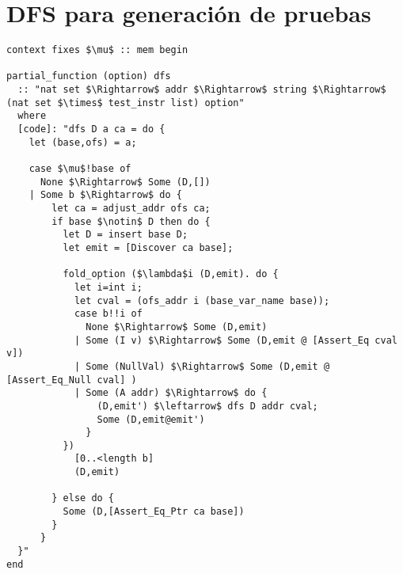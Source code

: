 \chapter{DFS para generación de pruebas}
\label{ap:dfs_test}

\begin{lstlisting}[mathescape=true]
context fixes $\mu$ :: mem begin

partial_function (option) dfs
  :: "nat set $\Rightarrow$ addr $\Rightarrow$ string $\Rightarrow$ (nat set $\times$ test_instr list) option"
  where
  [code]: "dfs D a ca = do {
    let (base,ofs) = a;

    case $\mu$!base of
      None $\Rightarrow$ Some (D,[])
    | Some b $\Rightarrow$ do {
        let ca = adjust_addr ofs ca;
        if base $\notin$ D then do {
          let D = insert base D;
          let emit = [Discover ca base];

          fold_option ($\lambda$i (D,emit). do {
            let i=int i;
            let cval = (ofs_addr i (base_var_name base));
            case b!!i of
              None $\Rightarrow$ Some (D,emit)
            | Some (I v) $\Rightarrow$ Some (D,emit @ [Assert_Eq cval v])
            | Some (NullVal) $\Rightarrow$ Some (D,emit @ [Assert_Eq_Null cval] )
            | Some (A addr) $\Rightarrow$ do {
                (D,emit') $\leftarrow$ dfs D addr cval;
                Some (D,emit@emit')
              }
          })
            [0..<length b]
            (D,emit)

        } else do {
          Some (D,[Assert_Eq_Ptr ca base])
        }
      }
  }"
end
\end{lstlisting}
